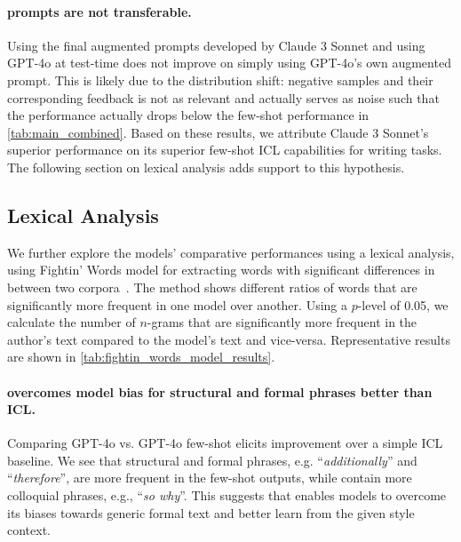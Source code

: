 \paragraph{\ours prompts are not transferable.}
Using the final augmented prompts developed by Claude 3 Sonnet and using GPT-4o at test-time does not improve on simply using GPT-4o's own augmented prompt. 
This is likely due to the distribution shift: negative samples and their corresponding feedback is not as relevant and actually serves as noise such that the performance actually drops below the few-shot performance in \autoref{tab:main_combined}. 
Based on these results, we attribute Claude 3 Sonnet's superior performance on its superior few-shot ICL capabilities for writing tasks. 
The following section on lexical analysis adds support to this hypothesis. 

\subsection{Lexical Analysis}
\label{sec:lexical_analysis}

We further explore the models' comparative performances using a lexical analysis, using 
Fightin' Words model for extracting words with significant differences in between two corpora~\cite{monroe2008fightin}. The method shows different ratios of words that are significantly more frequent in one model over another. 
Using a $p$-level of 0.05, we calculate the number of $n$-grams that are significantly more frequent in the author's text compared to the model's text and vice-versa.
Representative results are shown in \autoref{tab:fightin_words_model_results}.


\paragraph{\ours overcomes model bias for structural and formal phrases better than ICL.}
Comparing GPT-4o \ours vs. GPT-4o few-shot elicits \ours improvement over a simple ICL baseline. 
We see that structural and formal phrases, e.g. ``\textit{additionally}'' and ``\textit{therefore}'', are more frequent in the few-shot outputs, while \ours contain more colloquial phrases, e.g., ``\textit{so why}''. 
This suggests that \ours enables models to overcome its biases towards generic formal text and better learn from the given style context. 

